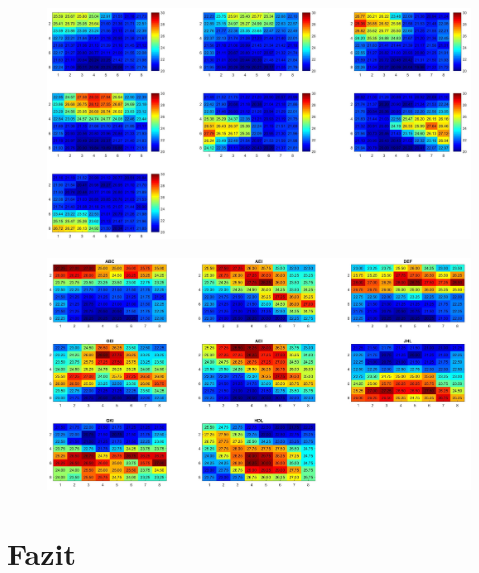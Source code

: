 \begin{figure}
	\centering
	\includegraphics[width=1.0\textwidth]{fig/p1_g_Allpositions_mean}
	\caption{}
	\label{fig:p1gallpositionsmean}
\end{figure}





\begin{figure}
	\centering
	\includegraphics[width=1.0\linewidth]{fig/p3_3x3_allpositons}
	\caption{}
	\label{fig:p33x3allpositons}
\end{figure}





\section{Fazit}